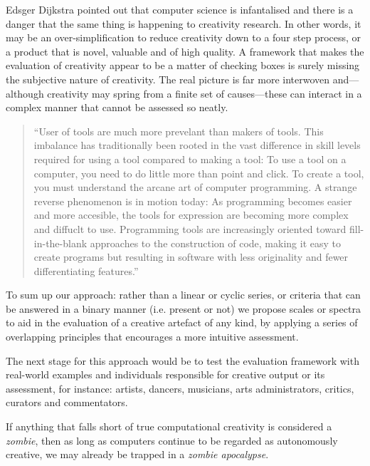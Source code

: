 Edsger Dijkstra pointed out that computer science is infantalised \autocite{Dijkstra1988} and there is a danger that the same thing is happening to creativity research. In other words, it may be an over-simplification to reduce creativity down to a four step process, or a product that is novel, valuable and of high quality. A framework that makes the evaluation of creativity appear to be a matter of checking boxes is surely missing the subjective nature of creativity. The real picture is far more interwoven and---although creativity may spring from a finite set of causes---these can interact in a complex manner that cannot be assessed so neatly.

\begin{quotation}
  ``User of tools are much more prevelant than makers of tools. This imbalance has traditionally been rooted in the vast difference in skill levels required for using a tool compared to making a tool: To use a tool on a computer, you need to do little more than point and click. To create a tool, you must understand the arcane art of computer programming. A strange reverse phenomenon is in motion today: As programming becomes easier and more accesible, the tools for expression are becoming more complex and diffuclt to use. Programming tools are increasingly oriented toward fill-in-the-blank approaches to the construction of code, making it easy to create programs but resulting in software with less originality and fewer differentiating features.'' \autocite{Maeda2004}
\end{quotation}

To sum up our approach: rather than a linear or cyclic series, or criteria that can be answered in a binary manner (i.e. present or not) we propose scales or spectra to aid in the evaluation of a creative artefact of any kind, by applying a series of overlapping principles that encourages a more intuitive assessment.

The next stage for this approach would be to test the evaluation framework with real-world examples and individuals responsible for creative output or its assessment, for instance: artists, dancers, musicians, arts administrators, critics, curators and commentators.

If anything that falls short of true computational creativity is considered a \textit{zombie}, then as long as computers continue to be regarded as autonomously creative, we may already be trapped in a \textit{zombie apocalypse}.

